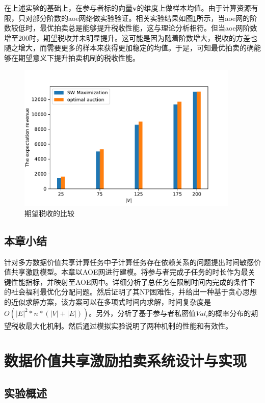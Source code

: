 \documentclass[promaster]{thesis-uestc}
\begin{document}
在上述实验的基础上，在参与者标的向量$\mathbf{v}$的维度上做样本均值。由于计算资源有限，只对部分阶数的aoe网络做实验验证。相关实验结果如图\ref{picc2}所示，当aoe网的阶数较低时，最优拍卖总是能够提升税收性能，这与理论分析相符。但当aoe网阶数增至200时，期望税收并未明显提升。这可能是因为随着阶数增大，税收的方差也随之增大，而需要更多的样本来获得更加稳定的均值。于是，可知最优拍卖的确能够在期望意义下提升拍卖机制的税收性能。

\begin{figure}[H]
    \includegraphics[width=300pt]{exp/expswandoptimal.pdf}
    \caption{期望税收的比较}
    \label{picc2}
\end{figure}

\FloatBarrier

\section{本章小结}

针对多方数据价值共享计算任务中子计算任务存在依赖关系的问题提出时间敏感价值共享激励模型。本章以AOE网进行建模。将参与者完成子任务的时长作为最关键性能指标，并映射至AOE网中。详细分析了总任务在限制时间内完成的条件下的社会福利最优化分配问题。然后证明了其NP困难性，并给出一种基于贪心思想的近似求解方案，该方案可以在多项式时间内求解，时间复杂度是$O(|E|^2*n*(|V|+|E|))$。另外，分析了基于参与者私密值$Val_i$的概率分布的期望税收最大化机制。然后通过模拟实验说明了两种机制的性能和有效性。


\chapter{数据价值共享激励拍卖系统设计与实现}

\section{实验概述}
\end{document}
